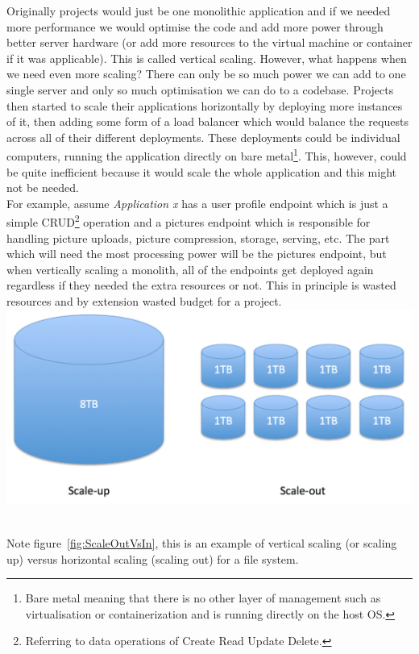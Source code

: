 \documentclass{article}
\begin{document}
\begin{multicols}{2}
Originally projects would just be one monolithic application and if we needed more performance we would optimise the code and add more power through better server hardware (or add more resources to the virtual machine or container if it was applicable). This is called vertical scaling. However, what happens when we need even more scaling? There can only be so much power we can add to one single server and only so much optimisation we can do to a codebase. Projects then started to scale their applications horizontally by deploying more instances of it, then adding some form of a load balancer which would balance the requests across all of their different deployments. These deployments could be individual computers, running the application directly on bare metal\footnote{Bare metal meaning that there is no other layer of management such as virtualisation or containerization and is running directly on the host OS.}. This, however, could be quite inefficient because it would scale the whole application and this might not be needed.\\
For example, assume \textit{Application x} has a user profile endpoint which is just a simple CRUD\footnote{Referring to data operations of Create Read Update Delete.} operation and a pictures endpoint which is responsible for handling picture uploads, picture compression, storage, serving, etc. The part which will need the most processing power will be the pictures endpoint, but when vertically scaling a monolith, all of the endpoints get deployed again regardless if they needed the extra resources or not. This in principle is wasted resources and by extension wasted budget for a project.\\

\begingroup
\centering
\includegraphics[width=0.9\linewidth]{./miscAssets/ScaleUpVsScaleOut.png}
~\label{fig:ScaleOutVsIn}
\endgroup

Note figure~\ref{fig:ScaleOutVsIn}, this is an example of vertical scaling (or scaling up) versus horizontal scaling (scaling out) for a file system. \\


\end{multicols}
\end{document}
